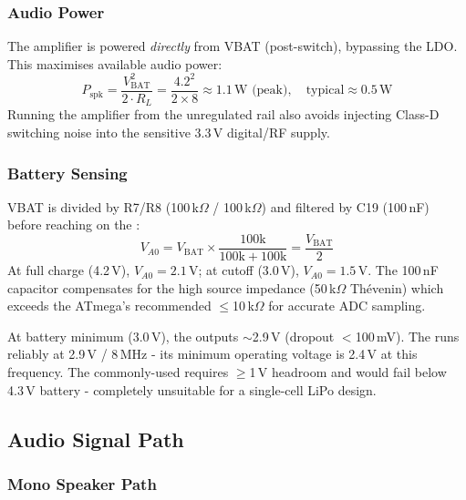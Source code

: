 \subsubsection{Audio Power}

The  amplifier is powered \emph{directly} from VBAT (post-switch),
bypassing the LDO.  This maximises available audio power:
%
\[
  P_{\text{spk}} = \frac{V_{\text{BAT}}^2}{2 \cdot R_L}
                 = \frac{4.2^2}{2 \times 8} \approx 1.1\,\text{W (peak)},
  \quad \text{typical} \approx 0.5\,\text{W}
\]
%
Running the amplifier from the unregulated rail also avoids injecting Class-D
switching noise into the sensitive 3.3\,V digital/RF supply.

\subsubsection{Battery Sensing}

VBAT is divided by R7/R8 (100\,k$\Omega$ / 100\,k$\Omega$) and filtered by
C19 (100\,nF) before reaching  on the :
%
\[
  V_{A0} = V_{\text{BAT}} \times \frac{100\text{k}}{100\text{k}+100\text{k}}
         = \frac{V_{\text{BAT}}}{2}
\]
%
At full charge (4.2\,V), $V_{A0} = 2.1$\,V; at cutoff (3.0\,V),
$V_{A0} = 1.5$\,V.  The 100\,nF capacitor compensates for the high source
impedance (50\,k$\Omega$ Thévenin) which exceeds the ATmega's recommended
$\leq$10\,k$\Omega$ for accurate ADC sampling.

\begin{calloutnote}
At battery minimum (3.0\,V), the  outputs $\sim$2.9\,V (dropout
$<$100\,mV).  The  runs reliably at 2.9\,V / 8\,MHz - its
minimum operating voltage is 2.4\,V at this frequency.  The commonly-used
 requires $\geq$1\,V headroom and would fail below 4.3\,V
battery - completely unsuitable for a single-cell LiPo design.
\end{calloutnote}

\subsection{Audio Signal Path}

\subsubsection{Mono Speaker Path}


